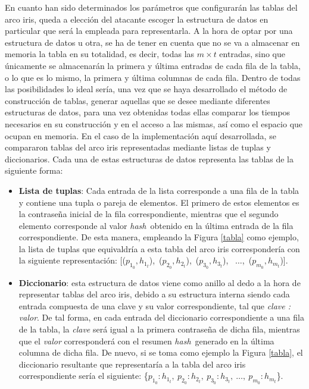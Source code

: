 \documentclass[12pt,spanish,listoffigures,listoftables]{tfgetsinf}
\newcommand{\hash}{\textit{hash}}
\begin{document}
En cuanto han sido determinados los parámetros que configurarán las tablas del arco iris, queda a elección del atacante escoger la estructura de datos en particular que será la empleada para representarla. A la hora de optar por una estructura de datos u otra, se ha de tener en cuenta que no se va a almacenar en memoria la tabla en su totalidad, es decir, todas las $m \times t$ entradas, sino que únicamente se almacenarán la primera y última entradas de cada fila de la tabla, o lo que es lo mismo, la primera y última columnas de cada fila. Dentro de todas las posibilidades lo ideal sería, una vez que se haya desarrollado el método de construcción de tablas, generar aquellas que se desee mediante diferentes estructuras de datos, para una vez obtenidas todas ellas comparar los tiempos necesarios en su construcción y en el acceso a las mismas, así como el espacio que ocupan en memoria. En el caso de la implementación aquí desarrollada, se compararon tablas del arco iris representadas mediante listas de tuplas y diccionarios. Cada una de estas estructuras de datos representa las tablas de la siguiente forma:

\begin{itemize}

    \item \textbf{Lista de tuplas}: Cada entrada de la lista corresponde a una fila de la tabla y contiene una tupla o pareja de elementos. El primero de estos elementos es la contraseña inicial de la fila correspondiente, mientras que el segundo elemento corresponde al valor \hash~obtenido en la última entrada de la fila correspondiente. De esta manera, empleando la Figura \ref{tabla} como ejemplo, la lista de tuplas que equivaldría a esta tabla del arco iris correspondería con la siguiente representación: [($p_{1_0}, h_{1_t}$),~($p_{2_0}, h_{2_t}$),~($p_{3_0}, h_{3_t}$), ~$\dots$,~($p_{m_0}, h_{m_t}$)].
    
    \item \textbf{Diccionario}: esta estructura de datos viene como anillo al dedo a la hora de representar tablas del arco iris, debido a su estructura interna siendo cada entrada compuesta de una clave y su valor correspondiente, tal que \textit{clave : valor}. De tal forma, en cada entrada del diccionario correspondiente a una fila de la tabla, la \textit{clave} será igual a la primera contraseña de dicha fila, mientras que el \textit{valor} corresponderá con el resumen \hash~generado en la última columna de dicha fila. De nuevo, si se toma como ejemplo la Figura \ref{tabla}, el diccionario resultante que representaría a la tabla del arco iris correspondiente sería el siguiente: \{$p_{1_0} : h_{1_t},~p_{2_0} : h_{2_t},~p_{3_0} : h_{3_t}, ~\dots,~p_{m_0} : h_{m_t}$\}.
    
\end{itemize}
\end{document}
